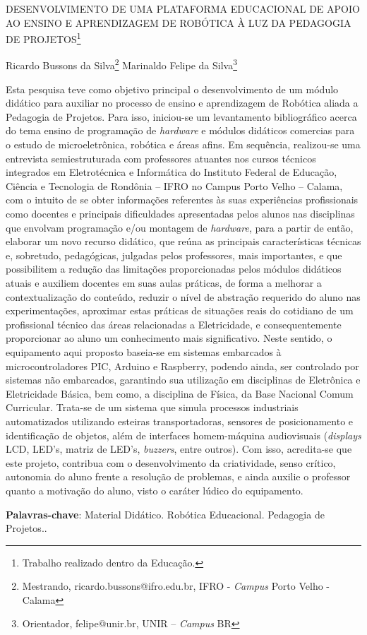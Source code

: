 \documentclass[article,12pt,onesidea,4paper,english,brazil]{abntex2}
\begin{document}
	
	
	\frenchspacing 
	
	\begin{center}
		\LARGE DESENVOLVIMENTO DE UMA PLATAFORMA EDUCACIONAL DE APOIO AO ENSINO E APRENDIZAGEM DE ROBÓTICA À LUZ DA PEDAGOGIA DE PROJETOS\footnote{Trabalho realizado dentro da Educação.}
		
		\normalsize
		Ricardo Bussons da Silva\footnote{Mestrando, ricardo.bussons@ifro.edu.br, IFRO - \textit{Campus} Porto Velho - Calama} 
		Marinaldo Felipe da Silva\footnote{Orientador, felipe@unir.br, UNIR – \textit{Campus} BR}  
	\end{center}
	
	\noindent Esta pesquisa teve como objetivo principal o desenvolvimento de um módulo
	didático para auxiliar no processo de ensino e aprendizagem de Robótica aliada a
	Pedagogia de Projetos. Para isso, iniciou-se um levantamento bibliográfico acerca
	do tema ensino de programação de \textit{hardware} e módulos didáticos comercias para o
	estudo de microeletrônica, robótica e áreas afins. Em sequência, realizou-se uma
	entrevista semiestruturada com professores atuantes nos cursos técnicos integrados
	em Eletrotécnica e Informática do Instituto Federal de Educação, Ciência e
	Tecnologia de Rondônia – IFRO no Campus Porto Velho – Calama, com o intuito de
	se obter informações referentes às suas experiências profissionais como docentes e
	principais dificuldades apresentadas pelos alunos nas disciplinas que envolvam
	programação e/ou montagem de \textit{hardware}, para a partir de então, elaborar um novo
	recurso didático, que reúna as principais características técnicas e, sobretudo,
	pedagógicas, julgadas pelos professores, mais importantes, e que possibilitem a
	redução das limitações proporcionadas pelos módulos didáticos atuais e auxiliem
	docentes em suas aulas práticas, de forma a melhorar a contextualização do
	conteúdo, reduzir o nível de abstração requerido do aluno nas experimentações,
	aproximar estas práticas de situações reais do cotidiano de um profissional técnico
	das áreas relacionadas a Eletricidade, e consequentemente proporcionar ao aluno
	um conhecimento mais significativo. Neste sentido, o equipamento aqui proposto
	baseia-se em sistemas embarcados à microcontroladores PIC, Arduino e Raspberry,
	podendo ainda, ser controlado por sistemas não embarcados, garantindo sua
	utilização em disciplinas de Eletrônica e Eletricidade Básica, bem como, a disciplina
	de Física, da Base Nacional Comum Curricular. Trata-se de um sistema que simula
	processos industriais automatizados utilizando esteiras transportadoras, sensores de
	posicionamento e identificação de objetos, além de interfaces homem-máquina
	audiovisuais (\textit{displays} LCD, LED’s, matriz de LED’s, \textit{buzzers}, entre outros). Com isso, acredita-se que este projeto, contribua com o desenvolvimento da criatividade,
	senso crítico, autonomia do aluno frente a resolução de problemas, e ainda auxilie o
	professor quanto a motivação do aluno, visto o caráter lúdico do equipamento.
	
	\vspace{\onelineskip}
	
	\noindent
	\textbf{Palavras-chave}: Material Didático. Robótica Educacional. Pedagogia de Projetos..
	
\end{document}
